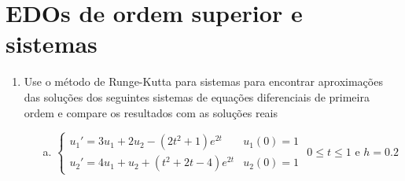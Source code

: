 \documentclass[a4paper, 11pt]{report}
\begin{document}
\section{EDOs de ordem superior e sistemas}
\begin{enumerate}[leftmargin=*]
    \item Use o método de Runge-Kutta para sistemas para encontrar aproximações das soluções dos seguintes sistemas de equações diferenciais de primeira ordem e compare os resultados com as soluções reais
    \begin{enumerate}[leftmargin=*]
        \item[a.] 
        $
        \left\{
        \begin{array}{ll}
            u_1' = 3u_1 + 2u_2 - (2t^2 + 1)e^{2t} & u_1 (0) = 1\\
            u_2' = 4u_1 + u_2 + (t^2 + 2t - 4)e^{2t} & u_2(0) = 1
        \end{array}
        \right.
        $
        $0 \leqslant t \leqslant 1$ e $h = 0.2$
        \vspace{5pt}


\end{enumerate}
\end{enumerate}
\end{document}
